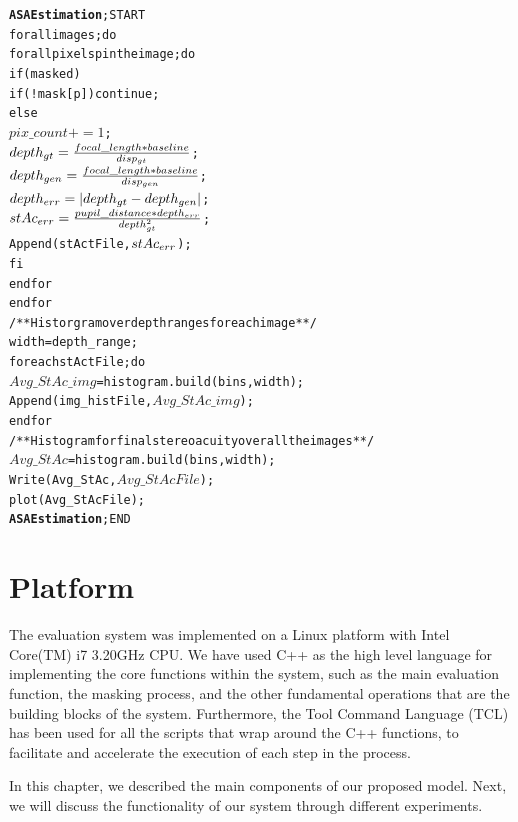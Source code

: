 \begin{alltt}
\textbf{ASA Estimation}; START
   for all images; do
      for all pixels p in the image; do
            if (masked)
               if(!mask[p]) continue;
            else 
               \(pix\_count += 1\);
               \(depth\sb{gt} = \frac{focal\_length * baseline}{disp\sb{gt}}\);
               \(depth\sb{gen} = \frac{focal\_length * baseline}{disp\sb{gen}}\);
               \(depth\sb{err} = |depth\sb{gt}-depth\sb{gen}|\);
               \(stAc\sb{err} = \frac{pupil\_distance*depth\sb{err}}{depth\sb{gt}\sp{2}}\);
               Append(stActFile,\(stAc\sb{err}\));
            fi 
      end for
   end for
   /**Historgram over depth ranges for each image**/
   width = depth\_range;
   for each stActFile; do
      \(Avg\_StAc\_img\) = histogram.build(bins,width);
      Append(img\_histFile,\(Avg\_StAc\_img\));
   end for
   /**Histogram for final stereoacuity over all the images**/
   \(Avg\_StAc\) = histogram.build(bins,width);
   Write(Avg\_StAc,\(Avg\_StAcFile\));
   plot(Avg\_StAcFile);
\textbf{ASA Estimation}; END
\end{alltt}

\section{Platform}
The evaluation system was implemented on a Linux platform with Intel Core(TM) i7 3.20GHz CPU. 
We have used C++ as the high level language for implementing 
the core functions within the system, such as the main evaluation function, 
the masking process, and the other fundamental operations that are the building blocks of the system.
Furthermore, the Tool Command Language (TCL) has been used for all the scripts that wrap around the C++ functions,
to facilitate and accelerate the execution of each step in the process. \newline

In this chapter, we described the main components of our proposed model. Next, we will discuss the functionality of our system through different experiments.
